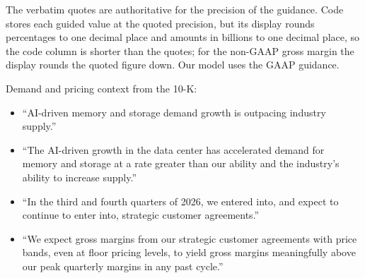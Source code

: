 \documentclass[a4paper,10pt]{article}
\begin{document}
\par{}\par\smallskip

The verbatim quotes are authoritative for the precision of the guidance. Code stores each guided value at the quoted precision, but its display rounds percentages to one decimal place and amounts in billions to one decimal place, so the code column is shorter than the quotes; for the non-GAAP gross margin the display rounds the quoted figure down. Our model uses the GAAP guidance.

Demand and pricing context from the 10-K:

\begin{itemize}\setlength{\itemsep}{1pt}
\item “AI-driven memory and storage demand growth is outpacing industry supply.”
\item “The AI-driven growth in the data center has accelerated demand for memory and storage at a rate greater than our ability and the industry’s ability to increase supply.”
\item “In the third and fourth quarters of 2026, we entered into, and expect to continue to enter into, strategic customer agreements.”
\item “We expect gross margins from our strategic customer agreements with price bands, even at floor pricing levels, to yield gross margins meaningfully above our peak quarterly margins in any past cycle.”
\end{itemize}
\end{document}
